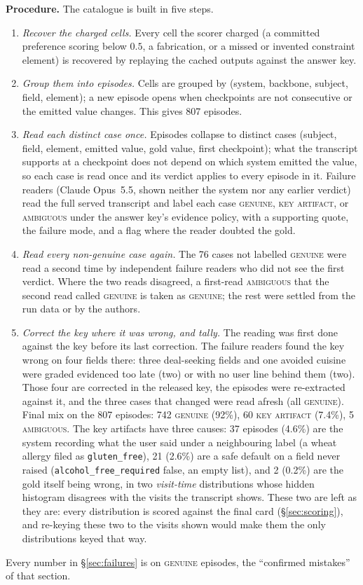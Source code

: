 \documentclass{article}
\begin{document}
\textbf{Procedure.} The catalogue is built in five steps.
\begin{enumerate}[leftmargin=*, itemsep=1pt, label=(\arabic*)]
  \item \emph{Recover the charged cells.} Every cell the scorer charged (a committed preference
  scoring below $0.5$, a fabrication, or a missed or invented constraint element) is recovered by replaying
  the cached outputs against the answer key.
  \item \emph{Group them into episodes.} Cells are grouped by (system, backbone, subject, field,
  element); a new episode opens when checkpoints are not consecutive or the emitted value changes.
  This gives 807 episodes.
  \item \emph{Read each distinct case once.} Episodes collapse to distinct cases
  (subject, field, element, emitted value, gold value, first checkpoint); what the transcript
  supports at a checkpoint does not depend on which system emitted the value, so each case is read
  once and its verdict applies to every episode in it. Failure readers (Claude Opus~5.5, shown neither
  the system nor any earlier verdict) read the
  full served transcript and label each case \textsc{genuine}, \textsc{key artifact}, or
  \textsc{ambiguous} under the answer key's evidence policy, with a supporting quote, the failure
  mode, and a flag where the reader doubted the gold.
  \item \emph{Read every non-genuine case again.} The 76 cases not labelled \textsc{genuine} were read
  a second time by independent failure readers who did not see the first verdict. Where the two reads
  disagreed, a first-read \textsc{ambiguous} that the second read called \textsc{genuine} is taken
  as \textsc{genuine}; the rest were settled from the run data or by the authors.
  \item \emph{Correct the key where it was wrong, and tally.} The reading was first done against the
  key before its last correction. The failure readers found the key wrong on four fields there: three
  deal-seeking fields and one avoided cuisine were graded evidenced too late (two) or with no user
  line behind them (two). Those four are corrected in the released key, the
  episodes were re-extracted against it, and the three cases that changed were read afresh (all
  \textsc{genuine}). Final mix on the 807 episodes: 742 \textsc{genuine} (92\%), 60
  \textsc{key artifact} (7.4\%), 5 \textsc{ambiguous}. The key artifacts have three causes: 37
  episodes (4.6\%) are the system recording what the user said under a neighbouring label (a wheat
  allergy filed as \texttt{gluten\_free}), 21 (2.6\%) are a safe default on a field never raised
  (\texttt{alcohol\_free\_required} false, an empty list), and 2 (0.2\%) are the gold itself being
  wrong, in two \emph{visit-time} distributions whose hidden histogram disagrees with the visits the
  transcript shows. These two are left as they are: every distribution is scored against the final
  card (\S\ref{sec:scoring}), and re-keying these two to the visits shown would make them the only
  distributions keyed that way.
\end{enumerate}
Every number in \S\ref{sec:failures} is on \textsc{genuine} episodes, the ``confirmed mistakes'' of
that section.
\end{document}
